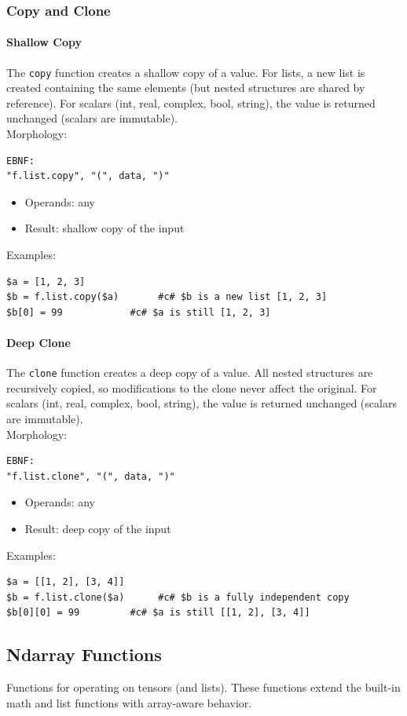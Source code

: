 \subsubsection{Copy and Clone}
\paragraph{Shallow Copy}
The \texttt{copy} function creates a shallow copy of a value. For lists, a new list is created containing the same elements (but nested structures are shared by reference). For scalars (int, real, complex, bool, string), the value is returned unchanged (scalars are immutable).\\
Morphology:
\begin{verbatim}
EBNF:
"f.list.copy", "(", data, ")"
\end{verbatim}
\begin{itemize}
\item Operands: any
\item Result: shallow copy of the input
\end{itemize}
Examples:
\begin{verbatim}
$a = [1, 2, 3]
$b = f.list.copy($a)       #c# $b is a new list [1, 2, 3]
$b[0] = 99            #c# $a is still [1, 2, 3]
\end{verbatim}

\paragraph{Deep Clone}
The \texttt{clone} function creates a deep copy of a value. All nested structures are recursively copied, so modifications to the clone never affect the original. For scalars (int, real, complex, bool, string), the value is returned unchanged (scalars are immutable).\\
Morphology:
\begin{verbatim}
EBNF:
"f.list.clone", "(", data, ")"
\end{verbatim}
\begin{itemize}
\item Operands: any
\item Result: deep copy of the input
\end{itemize}
Examples:
\begin{verbatim}
$a = [[1, 2], [3, 4]]
$b = f.list.clone($a)      #c# $b is a fully independent copy
$b[0][0] = 99         #c# $a is still [[1, 2], [3, 4]]
\end{verbatim}

\subsection{Ndarray Functions}
Functions for operating on tensors (and lists). These functions extend the built-in math and list functions with array-aware behavior.

